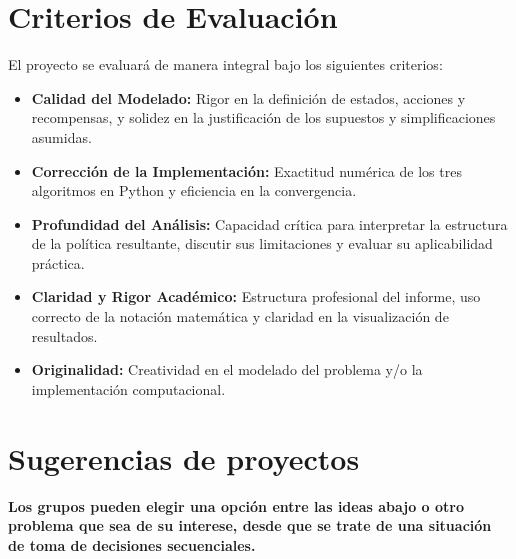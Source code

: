 \documentclass[11pt]{article}
\begin{document}
\section*{Criterios de Evaluación}
El proyecto se evaluará de manera integral bajo los siguientes criterios:

\begin{itemize}
    \item \textbf{Calidad del Modelado:} Rigor en la definición de estados, acciones y recompensas, y solidez en la justificación de los supuestos y simplificaciones asumidas.
    \item \textbf{Corrección de la Implementación:} Exactitud numérica de los tres algoritmos en Python y eficiencia en la convergencia.
    \item \textbf{Profundidad del Análisis:} Capacidad crítica para interpretar la estructura de la política resultante, discutir sus limitaciones y evaluar su aplicabilidad práctica.
    \item \textbf{Claridad y Rigor Académico:} Estructura profesional del informe, uso correcto de la notación matemática y claridad en la visualización de resultados.
    \item \textbf{Originalidad:} Creatividad en el modelado del problema y/o la implementaci\'on computacional. 
\end{itemize}

\newpage

\section*{Sugerencias de proyectos}

\textbf{Los grupos pueden elegir una opción entre las ideas abajo o otro problema que sea de su interese, desde que se trate de una situación de toma de decisiones secuenciales.}
\end{document}
